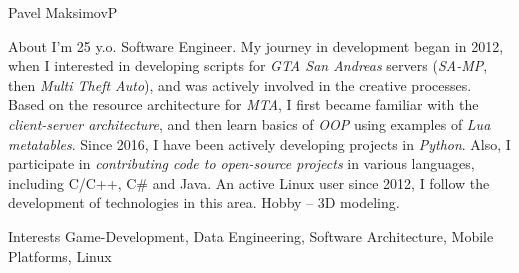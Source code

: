\documentclass[10pt]{extarticle}
\begin{document}
	\begin{centralpart}{Pavel Maksimov}{P}{}
		\begin{titleblock}{About}{}{}{}
			\hspace{15pt} I'm 25 y.o. Software Engineer. My journey in development began in 2012, when I interested in developing scripts for \textit{GTA San Andreas} servers (\textit{SA-MP}, then \textit{Multi Theft Auto}), and was actively involved in the creative processes. Based on the resource architecture for \textit{MTA}, I first became familiar with the \textit{client-server architecture}, and then learn basics of \textit{OOP} using examples of \textit{Lua metatables}. Since 2016, I have been actively developing projects in \textit{Python}. Also, I participate in \textit{contributing code to open-source projects} in various languages, including C/C++, C\# and Java. An active Linux user since 2012, I follow the development of technologies in this area. Hobby -- 3D modeling.
		\end{titleblock}

		\begin{titleblock}{Interests}{}{}{}
			\hspace{15pt} Game-Development, Data Engineering, Software Architecture, Mobile Platforms, Linux
		\end{titleblock}

	\end{centralpart}

	\UpdatePosition
	
\end{document}
